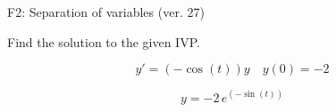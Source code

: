 \begin{exercise}
  \begin{exerciseTitle}F2: Separation of variables (ver. 27)\end{exerciseTitle}
  \begin{exerciseStatement}
    
Find the solution to the given IVP.

    
\[y'=( -\cos\left(t\right) )y\hspace{1em} y(0)= -2\]

  \end{exerciseStatement}
  \begin{exerciseAnswer}
    
\[y= -2 \, e^{\left(-\sin\left(t\right)\right)}\]

  \end{exerciseAnswer}
\end{exercise}